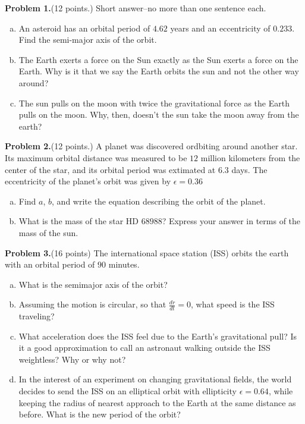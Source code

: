 \documentclass[12pt]{article}
\begin{document}
\bigskip

\bigskip

{\bf Problem 1.}(12 points.) Short answer--no more than one sentence each. 
\begin{enumerate}[(a)]
\item An asteroid has an orbital period of $4.62$ years and an eccentricity of $0.233$. Find the semi-major axis of the orbit.
\bigskip
\bigskip
\bigskip
\bigskip
\bigskip
\item The Earth exerts a force on the Sun exactly as the Sun exerts a force on the Earth. Why is it that we say the Earth orbits the sun and not the other way around?
\bigskip
\bigskip
\bigskip
\bigskip
\bigskip
\item The sun pulls on the moon with twice the gravitational force as the Earth pulls on the moon. Why, then, doesn't the sun take the moon away from the earth?
\bigskip
\bigskip
\bigskip
\bigskip
\bigskip
\end{enumerate}
{\bf Problem 2.}(12 points.) 
A planet was discovered ordbiting around another star. Its maximum orbital distance was measured to be $12$ million kilometers from the center of the star, and its orbital period was extimated at $6.3$ days. The eccentricity of the planet's orbit was given by $\epsilon = 0.36$
\begin{enumerate}[(a)]
\item Find $a$, $b$, and write the equation describing the orbit of the planet.
\bigskip
\bigskip
\bigskip
\bigskip
\bigskip
\bigskip
\bigskip
\bigskip
\bigskip
\bigskip
\bigskip
\bigskip
\item What is the mass of the star HD $68988$? Express your answer in terms of the mass of the sun.
\bigskip
\bigskip
\bigskip
\bigskip
\bigskip
\bigskip
\bigskip
\end{enumerate}
{\bf Problem 3.}(16 points) 
The international space station (ISS) orbits the earth with an orbital period of $90$ minutes.  
\begin{enumerate}[(a)]
\item What is the semimajor axis of the orbit? 
\bigskip
\bigskip
\bigskip
\bigskip
\bigskip
\item Assuming the motion is circular, so that $\frac{dr}{dt} = 0$, what speed is the ISS traveling?
\bigskip
\bigskip
\bigskip
\bigskip
\bigskip
\bigskip
\bigskip
\bigskip
\item What acceleration does the ISS feel due to the Earth's gravitational pull? Is it a good approximation to call an astronaut walking outside the ISS weightless? Why or why not?
\bigskip
\bigskip
\bigskip
\bigskip
\bigskip
\bigskip
\bigskip
\bigskip
\bigskip
\bigskip
\item In the interest of an experiment on changing gravitational fields, the world decides to send the ISS on an elliptical orbit with ellipticity $\epsilon = 0.64$, while keeping the radius of nearest approach to the Earth at the same distance as before. What is the new period of the orbit?
\bigskip
\bigskip
\bigskip
\bigskip
\bigskip
\bigskip
\bigskip
\end{enumerate}
\end{document}
